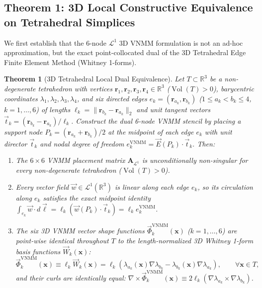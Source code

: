 \documentclass[preprint,12pt]{elsarticle}
\newtheorem{theorem}{Theorem}
\newcommand{\curl}{\nabla \times}
\newcommand{\R}{\mathbb{R}}
\begin{document}
\subsection{Theorem 1: 3D Local Constructive Equivalence on Tetrahedral Simplices}
\label{subsec:theorem_equivalence_3d}

We first establish that the 6-node $\mathcal{L}^1$ 3D VNMM formulation is not an ad-hoc approximation, but the exact point-collocated dual of the 3D Tetrahedral Edge Finite Element Method (Whitney 1-forms).

\begin{theorem}[3D Tetrahedral Local Dual Equivalence]
\label{thm:dual_equiv_3d}
Let $T \subset \R^3$ be a non-degenerate tetrahedron with vertices $\mathbf{r}_1, \mathbf{r}_2, \mathbf{r}_3, \mathbf{r}_4 \in \R^3$ ($\operatorname{Vol}(T) > 0$), barycentric coordinates $\lambda_1, \lambda_2, \lambda_3, \lambda_4$, and six directed edges $e_k = (\mathbf{r}_{a_k}, \mathbf{r}_{b_k})$ ($1 \le a_k < b_k \le 4$, $k = 1, \dots, 6$) of lengths $\ell_k = \|\mathbf{r}_{b_k} - \mathbf{r}_{a_k}\|_2$ and unit tangent vectors $\vec{t}_k = (\mathbf{r}_{b_k} - \mathbf{r}_{a_k})/\ell_k$. Construct the dual 6-node VNMM stencil by placing a support node $P_k = (\mathbf{r}_{a_k} + \mathbf{r}_{b_k})/2$ at the midpoint of each edge $e_k$ with unit director $\vec{t}_k$ and nodal degree of freedom $e_k^{\text{VNMM}} = \vec{E}(P_k)\cdot\vec{t}_k$. Then:
\begin{enumerate}
    \item The $6\times 6$ VNMM placement matrix $\mathbf{A}_{\mathcal{L}^1}$ is unconditionally non-singular for every non-degenerate tetrahedron ($\operatorname{Vol}(T) > 0$).
    \item Every vector field $\vec{w} \in \mathcal{L}^1(\R^3)$ is linear along each edge $e_k$, so its circulation along $e_k$ satisfies the exact midpoint identity $\int_{e_k} \vec{w}\cdot d\vec{\ell} = \ell_k (\vec{w}(P_k)\cdot\vec{t}_k) = \ell_k e_k^{\text{VNMM}}$.
    \item The six 3D VNMM vector shape functions $\vec{\Phi}_k^{\text{VNMM}}(\mathbf{x})$ ($k=1,\dots,6$) are point-wise identical throughout $T$ to the length-normalized 3D Whitney 1-form basis functions $\vec{W}_k(\mathbf{x})$:
    \begin{equation}
        \vec{\Phi}_k^{\text{VNMM}}(\mathbf{x}) \equiv \ell_k \vec{W}_k(\mathbf{x}) = \ell_k \left( \lambda_{a_k}(\mathbf{x})\nabla\lambda_{b_k} - \lambda_{b_k}(\mathbf{x})\nabla\lambda_{a_k} \right), \qquad \forall \mathbf{x} \in T,
        \label{eq:whitney_vnmm_identity_3d}
    \end{equation}
    and their curls are identically equal: $\curl\vec{\Phi}_k^{\text{VNMM}}(\mathbf{x}) \equiv 2\ell_k (\nabla\lambda_{a_k} \times \nabla\lambda_{b_k})$.
\end{enumerate}
\end{theorem}
\end{document}
